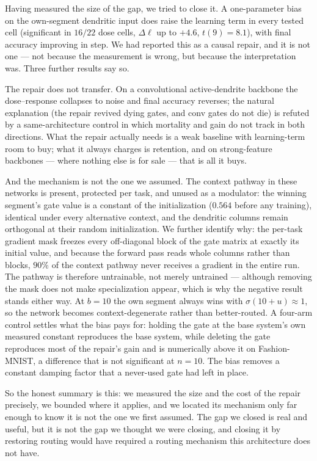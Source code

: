 \documentclass[10pt]{article}
\begin{document}
Having measured the size of the gap, we tried to close it. A one-parameter
bias on the own-segment dendritic input does raise the learning term in every
tested cell (significant in
$16/22$ dose cells, $\Delta\ell$ up to $+4.6$,
$t(9){=}8.1$), with final accuracy improving in step. We had reported this as
a causal repair, and it is not one --- not because the measurement is wrong,
but because the interpretation was. Three further results say so.

The repair does not transfer. On a convolutional active-dendrite backbone the
dose--response collapses to noise and final accuracy reverses; the natural
explanation (the repair revived dying gates, and conv gates do not die) is
refuted by a same-architecture control in which mortality and gain do not track
in both directions. What the repair actually needs is a weak baseline with
learning-term room to buy; what it always charges is retention, and on
strong-feature backbones --- where nothing else is for sale --- that is all it
buys.

And the mechanism is not the one we assumed. The context pathway in these
networks is present, protected per task, and unused as a modulator: the
winning segment's gate value is a constant of the initialization ($0.564$
before any training), identical under every alternative context, and the
dendritic columns remain orthogonal at their random initialization. We
further identify why: the per-task gradient mask freezes every
off-diagonal block of the gate matrix at exactly its initial value, and
because the forward pass reads whole columns rather than blocks, $90\%$
of the context pathway never receives a gradient in the entire run. The
pathway is therefore untrainable, not merely untrained --- although
removing the mask does not make specialization appear, which is why the
negative result stands either way. At $b{=}10$ the own segment always wins with
$\sigma(10+u)\approx 1$, so the network becomes context-degenerate rather
than better-routed. A four-arm control settles what the bias pays for:
holding the gate at the base system's own measured constant reproduces the
base system, while deleting the gate reproduces most of the repair's gain and
is numerically above it on Fashion-MNIST, a difference that is not significant at
$n{=}10$. The bias removes a constant
damping factor that a never-used gate had left in place.

So the honest summary is this: we measured the size and the cost of the
repair precisely, we bounded where it applies, and we located its mechanism
only far enough to know it is not the one we first assumed. The gap we
closed is real and useful, but it is not the gap we thought we were closing,
and closing it by restoring routing would have required a routing mechanism
this architecture does not have.
\end{document}
